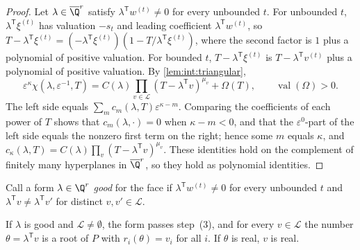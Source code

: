 \begin{proof}
Let $\lambda\in\overline\Q^r$ satisfy $\lambda^{\mathsf T}w^{(t)}\ne0$ for every
unbounded $t$. For unbounded $t$, $\lambda^{\mathsf T}\xi^{(t)}$ has valuation
$-s_t$ and leading coefficient $\lambda^{\mathsf T}w^{(t)}$, so
$T-\lambda^{\mathsf T}\xi^{(t)}=(-\lambda^{\mathsf T}\xi^{(t)})
(1-T/\lambda^{\mathsf T}\xi^{(t)})$, where the second factor is $1$ plus a
polynomial of positive valuation. For bounded $t$,
$T-\lambda^{\mathsf T}\xi^{(t)}$ is $T-\lambda^{\mathsf T}v^{(t)}$ plus a
polynomial of positive valuation. By \cref{lem:int:triangular},
\[
 \varepsilon^\kappa\chi(\lambda,\varepsilon^{-1},T)
 =C(\lambda)\prod_{v\in\mathcal L}(T-\lambda^{\mathsf T}v)^{\mu_v}+\Omega(T),
 \qquad\operatorname{val}(\Omega)>0 .
\]
The left side equals $\sum_mc_m(\lambda,T)\varepsilon^{\kappa-m}$. Comparing the
coefficients of each power of $T$ shows that $c_m(\lambda,\cdot)=0$ when
$\kappa-m<0$, and that the $\varepsilon^0$-part of the left side equals the
nonzero first term on the right; hence some $m$ equals $\kappa$, and
$c_\kappa(\lambda,T)=C(\lambda)\prod_v(T-\lambda^{\mathsf T}v)^{\mu_v}$. These
identities hold on the complement of finitely many hyperplanes in
$\overline\Q^r$, so they hold as polynomial identities.
\end{proof}

Call a form $\lambda\in\Q^r$ \emph{good} for the face if
$\lambda^{\mathsf T}w^{(t)}\ne0$ for every unbounded $t$ and
$\lambda^{\mathsf T}v\ne\lambda^{\mathsf T}v'$ for distinct $v,v'\in\mathcal L$.

\begin{lemma}\label{lem:int:recovery}
If $\lambda$ is good and $\mathcal L\ne\emptyset$, the form passes step~(3), and
for every $v\in\mathcal L$ the number $\theta=\lambda^{\mathsf T}v$ is a root of
$P$ with $r_i(\theta)=v_i$ for all $i$. If $\theta$ is real, $v$ is real.
\end{lemma}

